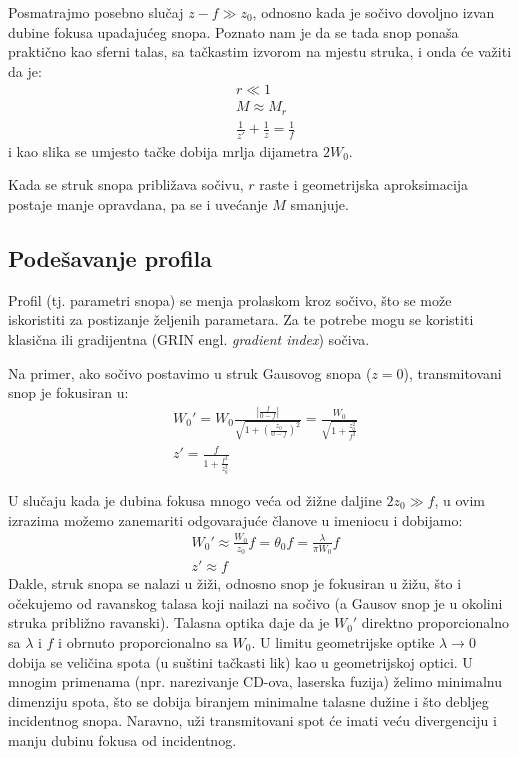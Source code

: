 \documentclass[fleqn]{report}
\begin{document}
Posmatrajmo posebno slučaj $z - f \gg z_0$, odnosno kada je sočivo dovoljno izvan dubine fokusa upadajućeg snopa.
Poznato nam je da se tada snop ponaša praktično kao sferni talas, sa tačkastim izvorom na mjestu struka, i onda će važiti da je:
\begin{align*}
     & r \ll 1                                  \\
     & M \approx M_r                            \\
     & \frac{1}{z'} + \frac{1}{z} = \frac{1}{f}
\end{align*}
i kao slika se umjesto tačke dobija mrlja dijametra $2W_0$.

Kada se struk snopa približava sočivu, $r$ raste i geometrijska aproksimacija postaje manje opravdana, pa se i uvećanje $M$ smanjuje.

\subsection{Podešavanje profila}

Profil (tj. parametri snopa) se menja prolaskom kroz sočivo, što se može iskoristiti za postizanje željenih parametara.
Za te potrebe mogu se koristiti klasična ili gradijentna (GRIN engl. \emph{gradient index}) sočiva.

Na primer, ako sočivo postavimo u struk Gausovog snopa ($z = 0$), transmitovani snop je fokusiran u:
\begin{align*}
     & W_0' = W_0 \frac{\left|\frac{f}{0-f}\right|}{\sqrt{1 + \left(\frac{z_0}{0 - f}\right)^2}} = \frac{W_0}{\sqrt{1 + \frac{z_0^2}{f^2}}} \\
     & z' = \frac{f}{1 + \frac{f^2}{z_0^2}}
\end{align*}

U slučaju kada je dubina fokusa mnogo veća od žižne daljine $2z_0 \gg f$, u ovim izrazima možemo zanemariti odgovarajuće članove u imeniocu i dobijamo:
\begin{align*}
     & W_0' \approx \frac{W_0}{z_0} f = \theta_0 f = \frac{\lambda}{\pi W_0} f \\
     & z' \approx f
\end{align*}
Dakle, struk snopa se nalazi u žiži, odnosno snop je fokusiran u žižu, što i očekujemo od ravanskog talasa koji nailazi na sočivo (a Gausov snop je u okolini struka približno ravanski).
Talasna optika daje da je $W_0'$ direktno proporcionalno sa $\lambda$ i $f$ i obrnuto proporcionalno sa $W_0$.
U limitu geometrijske optike $\lambda \to 0$ dobija se veličina spota (u suštini tačkasti lik) kao u geometrijskoj optici.
U mnogim primenama (npr. narezivanje CD-ova, laserska fuzija) želimo minimalnu dimenziju spota, što se dobija biranjem minimalne talasne dužine i što debljeg incidentnog snopa.
Naravno, uži transmitovani spot će imati veću divergenciju i manju dubinu fokusa od incidentnog.
\end{document}
